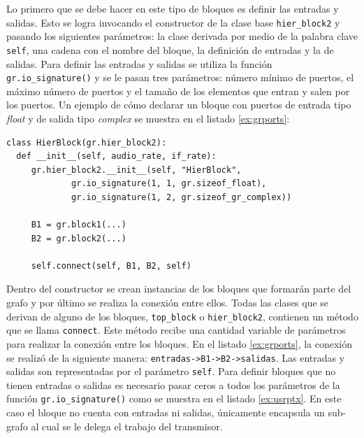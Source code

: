Lo primero que se debe hacer en este tipo de bloques es definir las entradas y salidas. Esto se
logra invocando el constructor de la clase base \verb|hier_block2| y pasando los siguientes
par\'ametros: la clase derivada por medio de la palabra clave \verb|self|, una cadena con el nombre
del bloque, la definici\'on de entradas y la de salidas. Para definir las entradas y salidas se
utiliza la funci\'on \verb|gr.io_signature()| y se le pasan tres par\'ametros: n\'umero m\'inimo de
puertos, el m\'aximo n\'umero de puertos y el tama\~no de los elementos que entran y salen por los
puertos. Un ejemplo de c\'omo declarar un bloque con puertos de entrada tipo \emph{float} y de salida
tipo \emph{complex} se muestra en el listado \ref{ex:grports}:

\begin{lstlisting}[float, frame=single, label=ex:grports, caption={Ejemplo de declaraci\'on de
entradas y salidas para un bloque jer\'arquico.}]
class HierBlock(gr.hier_block2):
  def __init__(self, audio_rate, if_rate):
     gr.hier_block2.__init__(self, "HierBlock",
             gr.io_signature(1, 1, gr.sizeof_float),
             gr.io_signature(1, 2, gr.sizeof_gr_complex))

     B1 = gr.block1(...)
     B2 = gr.block2(...)
 
     self.connect(self, B1, B2, self)
\end{lstlisting}

Dentro del constructor se crean instancias de los bloques que formar\'an parte del grafo y por
\'ultimo se realiza la conexi\'on entre ellos. Todas las clases que se derivan de alguno de los
bloques, \verb|top_block| o \verb|hier_block2|, contienen un m\'etodo que se llama
\verb|connect|. Este m\'etodo recibe una cantidad variable de par\'ametros para realizar la conexi\'on
entre los bloques. En el listado \ref{ex:grports}, la conexi\'on se realiz\'o de la siguiente manera:
\verb|entradas->B1->B2->salidas|. Las entradas y salidas son representadas por el par\'ametro
\verb|self|. Para definir bloques que no tienen entradas o salidas es necesario pasar ceros a
todos los par\'ametros de la funci\'on \verb|gr.io_signature()| como se muestra en el listado
\ref{ex:usrptx}. En este caso el bloque no cuenta con entradas ni salidas, \'unicamente encapsula un
sub-grafo al cual se le delega el trabajo del transmisor.

